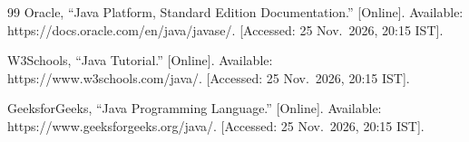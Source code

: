 \clearpage
{}
{}

\begin{thebibliography}{99}
 Oracle, \enquote{Java Platform, Standard Edition Documentation.}
[Online]. Available: https://docs.oracle.com/en/java/javase/.
[Accessed: 25 Nov.\ 2026, 20:15 IST].

 W3Schools, \enquote{Java Tutorial.} [Online]. Available:
https://www.w3schools.com/java/. [Accessed: 25 Nov.\ 2026, 20:15 IST].

 GeeksforGeeks, \enquote{Java Programming Language.} [Online].
Available: https://www.geeksforgeeks.org/java/.
[Accessed: 25 Nov.\ 2026, 20:15 IST].
\end{thebibliography}
